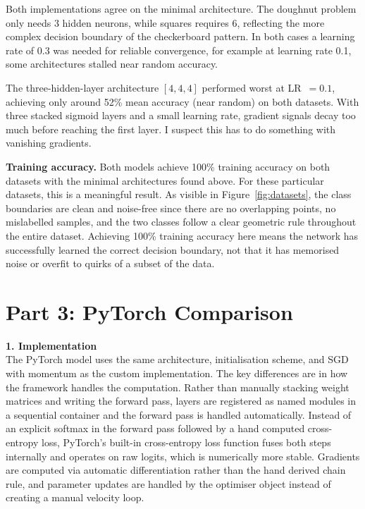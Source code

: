 \documentclass[fleqn,moreauthors,10pt]{ds_report}
\begin{document}
Both implementations agree on the minimal architecture. The doughnut problem only
needs 3 hidden neurons, while squares requires 6, reflecting the more complex
decision boundary of the checkerboard pattern. In both cases a learning rate of 0.3 was needed for reliable
convergence, for example at learning rate 0.1, some architectures stalled near random accuracy.

The three-hidden-layer architecture $[4,4,4]$ performed worst at LR~$= 0.1$,
achieving only around 52\% mean accuracy (near random) on both datasets. With
three stacked sigmoid layers and a small learning rate, gradient signals decay too
much before reaching the first layer. I suspect this has to do something with vanishing gradients.
\vspace{0.3cm}

\textbf{Training accuracy.} Both models achieve 100\% training accuracy on both
datasets with the minimal architectures found above. For these particular datasets,
this is a meaningful result. As visible in Figure~\ref{fig:datasets}, the class
boundaries are clean and noise-free since there are no overlapping points, no
mislabelled samples, and the two classes follow a clear geometric rule throughout
the entire dataset. Achieving 100\% training accuracy here means the network has
successfully learned the correct decision boundary, not that it has memorised
noise or overfit to quirks of a subset of the data.


\section*{Part 3: PyTorch Comparison}

\textbf{1. Implementation}\\
The PyTorch model uses the same architecture, initialisation scheme, and SGD with
momentum as the custom implementation. The key differences are in how the framework
handles the computation. Rather than manually stacking weight matrices and writing
the forward pass, layers are registered as named modules in a sequential container
and the forward pass is handled automatically. Instead of an explicit softmax in the
forward pass followed by a hand computed cross-entropy loss, PyTorch's built-in
cross-entropy loss function fuses both steps internally and operates on raw logits,
which is numerically more stable. Gradients are computed via automatic differentiation
rather than the hand derived chain rule, and parameter updates are handled by the
optimiser object instead of creating a manual velocity loop.
\vspace{0.3cm}
 
\end{document}
